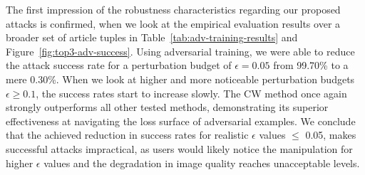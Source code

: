 The first impression of the robustness characteristics regarding our proposed attacks is confirmed, when we look at the empirical evaluation results over a broader set of article tuples in Table~\ref{tab:adv-training-results} and Figure~\ref{fig:top3-adv-success}. Using adversarial training, we were able to reduce the attack success rate for a perturbation budget of $\epsilon=0.05$ from 99.70\% to a mere 0.30\%. When we look at higher and more noticeable perturbation budgets $\epsilon\ge0.1$, the success rates start to increase slowly. The \ac{CW} method once again strongly outperforms all other tested methods, demonstrating its superior effectiveness at navigating the loss surface of adversarial examples. We conclude that the achieved reduction in success rates for realistic $\epsilon$ values $\le$ 0.05, makes successful attacks impractical, as users would likely notice the manipulation for higher $\epsilon$ values and the degradation in image quality reaches unacceptable levels.

